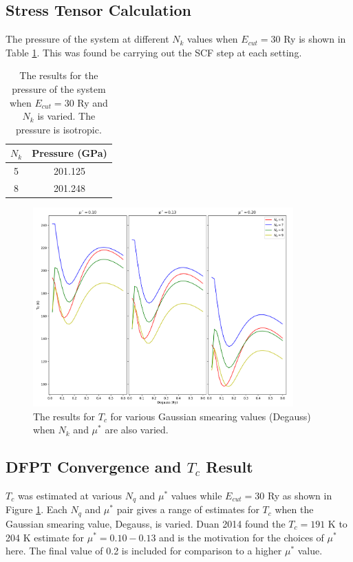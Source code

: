 \documentclass[a4paper,12pt]{article}
\begin{document}
\subsection{Stress Tensor Calculation}
The pressure of the system at different $N_k$ values when $E_{cut}=30$ Ry is shown in Table \ref{tab:press}. This was found be carrying out the SCF step at each setting.

\begin{table}[h!!!]
	\centering
	\begin{tabular}{|c|c|}
		\hline
		$N_k$ & Pressure (GPa) \\ \hline
		5     & 201.125        \\ \hline
		8     & 201.248        \\ \hline
	\end{tabular}
	\caption{The results for the pressure of the system when $E_{cut} =30$ Ry and $N_k$ is varied. The pressure is isotropic.}
	\label{tab:press}
\end{table}

\begin{figure}[h!!!!!!!!!!!]
	\centering
	\includegraphics[width=10cm]{Tc_conv-test.png}
	\caption{The results for $T_c$ for various Gaussian smearing values (Degauss) when $N_k$ and $\mu^*$ are also varied.}
	\label{fig:Tc-conv}
\end{figure}

\subsection{DFPT Convergence and $T_c$ Result}
$T_c$ was estimated at various $N_q$ and $\mu^*$ values while $E_{cut}=30$ Ry as shown in Figure \ref{fig:Tc-conv}. Each $N_q$ and $\mu^*$ pair gives a range of estimates for $T_c$ when the Gaussian smearing value, Degauss, is varied. Duan 2014 \cite{duan} found the $T_c = 191$ K to 204 K estimate for $\mu^*=0.10-0.13$ and is the motivation for the choices of $\mu^*$ here. The final value of 0.2 is included for comparison to a higher $\mu^*$ value.
\end{document}
